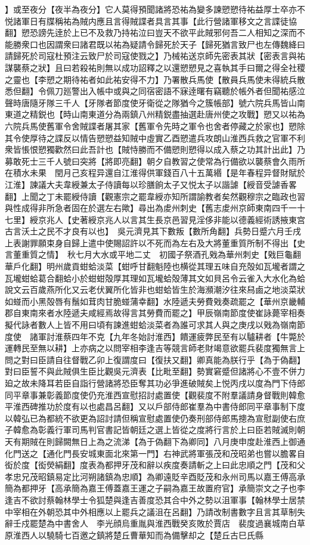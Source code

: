 】或至夜分【夜半為夜分】它人莫得預聞諸將恐祐為變多諫愬愬待祐益厚士卒亦不悦諸軍日有牒稱祐為賊内應且言得賊諜者具言其事【此行營諸軍移文之言諜徒協翻】愬恐謗先逹於上已不及救乃持祐泣曰豈天不欲平此賊邪何吾二人相知之深而不能勝衆口也因謂衆曰諸君既以祐為疑請令歸死於天子【歸死猶言致尸也左傳魏絳曰請歸死於司寇杜預注云致尸於司寇使戮之】乃械祐送京師先密表其狀【密表言與祐謀襲蔡之狀】且曰若殺祐則無以成功詔釋之以還愬愬見之喜執其手曰爾之得全社稷之靈也【李愬之期待祐者如此祐安得不力】乃署散兵馬使【散員兵馬使未得統兵散悉但翻】令佩刀廵警出入帳中或與之同宿密語不寐逹曙有竊聽於帳外者但聞祐感泣聲時唐隨牙隊三千人【牙隊者節度使牙衛從之隊猶今之簇帳部】號六院兵馬皆山南東道之精鋭也【時山南東道分為兩鎮八州精鋭盡抽選赴唐州使之攻戰】愬又以祐為六院兵馬使舊軍令舍賊諜者屠其家【舊軍令先時之軍令也舍者停藏之於家也】愬除其令使厚待之諜反以情告愬愬益知賊中虛實乙酉愬遣兵攻朗山淮西兵救之官軍不利衆皆悵恨愬獨歡然曰此吾計也【賊恃勝而不備愬則愬得以成入蔡之功其計出此】乃募敢死士三千人號曰突將【將即亮翻】朝夕自教習之使常為行備欲以襲蔡會久雨所在積水未果　閏月己亥程异還自江淮得供軍錢百八十五萬緡【是年春程异督財賦於江淮】諫議大夫韋綬兼太子侍讀每以珍膳餉太子又悦太子以諧謔【綬音受謔香畧翻】上聞之丁未罷綬侍讀【觀憲宗之罷韋綬亦知所謂諭教者矣然觀穆宗之臨政也習與性成得非所急者固在於選左右歟】尋出為䖍州刺史【舊志䖍州京師東南四千一十七里】綬京兆人【史著綬京兆人以言其生長京邑習見淫侈非能以德義經術誘掖東宫古言沃土之民不才良有以也】　吳元濟見其下數叛【數所角翻】兵勢日蹙六月壬戌上表謝罪願束身自歸上遣中使賜詔許以不死而為左右及大將董重質所制不得出【史言董重質之情】　秋七月大水或平地二丈　初國子祭酒孔戣為華州刺史【戣巨龜翻華戶化翻】明州歲貢蚶蛤淡菜【蚶呼甘翻魁陸也横從其理五味自充殻如瓦壠者謂之瓦壠蚶蛤葛合翻蛤小於蚶蚶殻厚其理如瓦壠蛤殻薄其文如貝呂令云雀入大水化為蛤說文云百歲燕所化又云老伏翼所化皆非也蚶蛤皆生於海瀕潮汐往來舄鹵之地淡菜狀如䗒而小黑殻唇有鬚如茸肉甘脆䗒蒲幸翻】水陸遞夫勞費戣奏疏罷之【華州京畿輔郡自東南來者水陸遞夫咸經焉故得言其勞費而罷之】甲辰嶺南節度使崔詠薨宰相奏擬代詠者數人上皆不用曰頃有諫進蚶蛤淡菜者為誰可求其人與之庚戌以戣為嶺南節度使　諸軍討淮蔡四年不克【九年冬始討淮西】饋運疲弊民至有以驢耕者【牛斃於運轉民至無以耕】上亦病之以問宰相李逢吉等競言師老財竭意欲罷兵裴度獨無言上問之對曰臣請自往督戰乙卯上復謂度曰【復扶又翻】卿真能為朕行乎【為于偽翻】對曰臣誓不與此賊俱生臣比觀吳元濟表【比毗至翻】勢實窘蹙但諸將心不壹不併力廹之故未降耳若臣自詣行營諸將恐臣奪其功必爭進破賊矣上悦丙戌以度為門下侍郎同平章事兼彰義節度使仍充淮西宣慰招討處置使【觀裴度不附羣議請身督戰則韓愈平淮西碑推功於度有以也處昌呂翻】又以戶部侍郎崔羣為中書侍郎同平章事制下度以韓弘已為都統不欲更為詔討請但稱宣慰處置使仍奏刑部侍郎馬摠為宣慰副使右庶子韓愈為彰義行軍司馬判官書記皆朝廷之選上皆從之度將行言於上曰臣若賊滅則朝天有期賊在則歸闕無日上為之流涕【為于偽翻下為卿同】八月庚申度赴淮西上御通化門送之【通化門長安城東面北來第一門】右神武將軍張茂和茂昭弟也嘗以膽畧自衒於度【衒熒絹翻】度表為都押牙茂和辭以疾度奏請斬之上曰此忠順之門【茂和父孝忠兄茂昭鎮易定比河朔諸鎮為忠順】為卿遠貶辛酉貶茂和永州司馬以嘉王傅高承簡為都押牙【高承簡為嘉王傅蓋嘉王運之子嗣為嘉王故置府官】承簡崇文之子也李逢吉不欲討蔡翰林學士令狐楚與逢吉善度恐其合中外之勢以沮軍事【翰林學士居禁中宰相在外朝恐其中外相應以上罷兵之議沮在呂翻】乃請改制書數字且言其草制失辭壬戍罷楚為中書舍人　李光顔烏重胤與淮西戰癸亥敗於賈店　裴度過襄城南白草原淮西人以驍騎七百邀之鎮將楚丘曹華知而為備擊却之【楚丘古巳氏縣